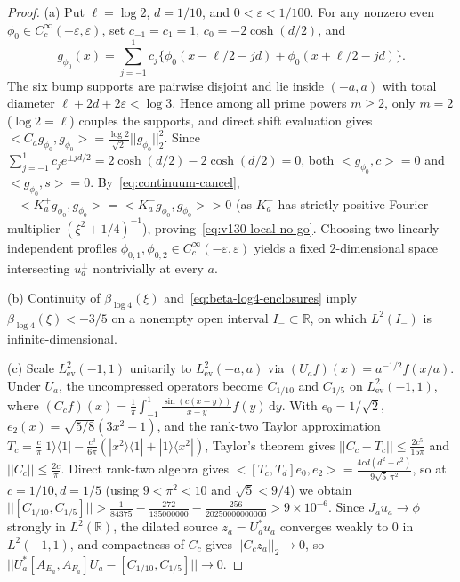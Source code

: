\documentclass[11pt]{article}
\def\norm#1{||#1||}%
\def\ip#1#2{<#1,#2>}%
\theoremstyle{remark}
\newcommand{\norm}[1]{\left\lVert #1\right\rVert}
\newcommand{\ip}[2]{\left\langle #1,#2\right\rangle}
\newcommand{\dd}{\mathrm d}
\begin{document}
\begin{proof}
(a) Put $\ell = \log 2$, $d = 1/10$, and $0 < \varepsilon < 1/100$. For any nonzero even $\phi_0 \in C_c^\infty(-\varepsilon, \varepsilon)$, set $c_{-1} = c_1 = 1$, $c_0 = -2\cosh(d/2)$, and
\[
  g_{\phi_0}(x) = \sum_{j=-1}^1 c_j\bigl\{\phi_0(x - \ell/2 - jd) + \phi_0(x + \ell/2 - jd)\bigr\}.
\]
The six bump supports are pairwise disjoint and lie inside $(-a,a)$ with total diameter $\ell + 2d + 2\varepsilon < \log 3$. Hence among all prime powers $m \ge 2$, only $m = 2$ ($\log 2 = \ell$) couples the supports, and direct shift evaluation gives $\ip{C_a g_{\phi_0}}{g_{\phi_0}} = \frac{\log 2}{\sqrt{2}}\norm{g_{\phi_0}}_2^2$. Since $\sum_{j=-1}^1 c_j e^{\pm jd/2} = 2\cosh(d/2) - 2\cosh(d/2) = 0$, both $\ip{g_{\phi_0}}{c} = 0$ and $\ip{g_{\phi_0}}{s} = 0$. By~\eqref{eq:continuum-cancel}, $-\ip{K_a^+ g_{\phi_0}}{g_{\phi_0}} = \ip{K_a^- g_{\phi_0}}{g_{\phi_0}} > 0$ (as $K_a^-$ has strictly positive Fourier multiplier $(\xi^2 + 1/4)^{-1}$), proving~\eqref{eq:v130-local-no-go}. Choosing two linearly independent profiles $\phi_{0,1}, \phi_{0,2} \in C_c^\infty(-\varepsilon,\varepsilon)$ yields a fixed $2$-dimensional space intersecting $u_a^\perp$ nontrivially at every $a$.

(b) Continuity of $\beta_{\log 4}(\xi)$ and~\eqref{eq:beta-log4-enclosures} imply $\beta_{\log 4}(\xi) < -3/5$ on a nonempty open interval $I_- \subset \mathbb{R}$, on which $L^2(I_-)$ is infinite-dimensional.

(c) Scale $L^2_{\mathrm{ev}}(-1,1)$ unitarily to $L^2_{\mathrm{ev}}(-a,a)$ via $(U_a f)(x) = a^{-1/2}f(x/a)$. Under $U_a$, the uncompressed operators become $C_{1/10}$ and $C_{1/5}$ on $L^2_{\mathrm{ev}}(-1,1)$, where $(C_c f)(x) = \frac{1}{\pi}\int_{-1}^1 \frac{\sin(c(x-y))}{x-y}f(y)\,\dd y$. With $e_0 = 1/\sqrt{2}$, $e_2(x) = \sqrt{5/8}(3x^2 - 1)$, and the rank-two Taylor approximation $T_c = \frac{c}{\pi}|1\rangle\langle 1| - \frac{c^3}{6\pi}(|x^2\rangle\langle 1| + |1\rangle\langle x^2|)$, Taylor's theorem gives $\norm{C_c - T_c} \le \frac{2c^5}{15\pi}$ and $\norm{C_c} \le \frac{2c}{\pi}$. Direct rank-two algebra gives $\ip{[T_c, T_d]e_0}{e_2} = \frac{4cd(d^2 - c^2)}{9\sqrt{5}\,\pi^2}$, so at $c = 1/10, d = 1/5$ (using $9 < \pi^2 < 10$ and $\sqrt{5} < 9/4$) we obtain $\norm{[C_{1/10}, C_{1/5}]} > \frac{1}{84375} - \frac{272}{135000000} - \frac{256}{20250000000000} > 9 \times 10^{-6}$. Since $J_a u_a \to \phi$ strongly in $L^2(\mathbb{R})$, the dilated source $z_a = U_a^* u_a$ converges weakly to $0$ in $L^2(-1,1)$, and compactness of $C_c$ gives $\norm{C_c z_a}_2 \to 0$, so $\norm{U_a^*[A_{E_a}, A_{F_a}]U_a - [C_{1/10}, C_{1/5}]} \to 0$.


\end{proof}
\end{document}
